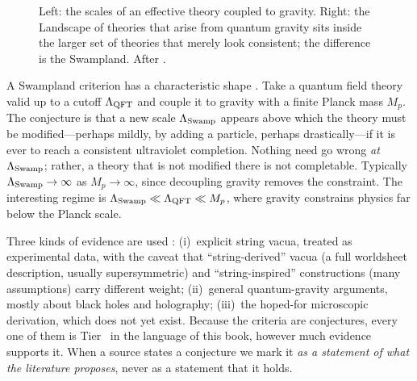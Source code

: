 \begin{figure}[ht]
\centering
{}
\caption{Left: the scales of an effective theory coupled to gravity. Right: the Landscape of
theories that arise from quantum gravity sits inside the larger set of theories that merely look
consistent; the difference is the Swampland. After .}
\label{fig:swampland:sets}
\end{figure}

A Swampland criterion has a characteristic shape . Take a
quantum field theory valid up to a cutoff $\Lambda_{\rm QFT}$ and couple it to gravity with a
finite Planck mass $M_p$. The conjecture is that a new scale $\Lambda_{\rm Swamp}$ appears above
which the theory must be modified---perhaps mildly, by adding a particle, perhaps drastically---if
it is ever to reach a consistent ultraviolet completion. Nothing need go wrong \emph{at}
$\Lambda_{\rm Swamp}$; rather, a theory that is not modified there is not completable. Typically
$\Lambda_{\rm Swamp}\to\infty$ as $M_p\to\infty$, since decoupling gravity removes the constraint.
The interesting regime is $\Lambda_{\rm Swamp}\ll\Lambda_{\rm QFT}\ll M_p$, where gravity
constrains physics far below the Planck scale.

Three kinds of evidence are used : (i)~explicit string vacua,
treated as experimental data, with the caveat that ``string-derived'' vacua (a full worldsheet
description, usually supersymmetric) and ``string-inspired'' constructions (many assumptions) carry
different weight; (ii)~general quantum-gravity arguments, mostly about black holes and
holography; (iii)~the hoped-for microscopic derivation, which does not yet exist. Because the
criteria are conjectures, every one of them is Tier~\TC{} in the language of this book, however much
evidence supports it. When a source states a conjecture we mark it \TL{} \emph{as a statement of
what the literature proposes}, never as a statement that it holds.

